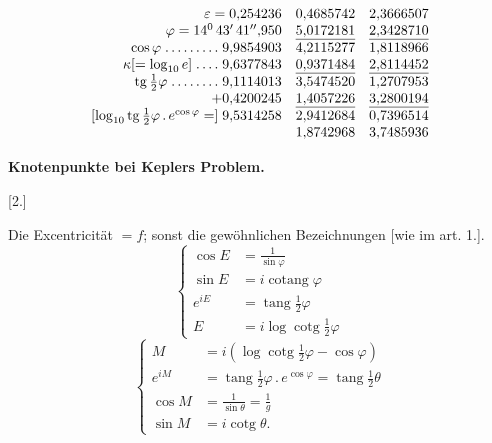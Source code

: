 \[\begin{array}{lrr}
\hfill\varepsilon=0{,}254236&0{,}4685742&2{,}3666507\\
\hfill\varphi=14^0\,43'\,41''{,}950&\underline{5{,}0172181}&\underline{2{,}3428710}\\
\hfill\cos\varphi\;{.}\,{.}\,{.}\,{.}\,{.}\,{.}\,{.}\,{.}\,{.}\;9{,}9854903&4{,}2115277&1{,}8118966\\
\hfill\kappa[=\log_{10}e]\;{.}\,{.}\,{.}\,{.}\;9{,}6377843&\underline{0{,}9371484}&\underline{2{,}8114452}\\
\hfill\operatorname{tg}\tfrac12\varphi\;{.}\,{.}\,{.}\,{.}\,{.}\,{.}\,{.}\,{.}\;9{,}1114013&3{,}5474520&1{,}2707953\\
\hfill+0{,}4200245&\underline{1{,}4057226}&\underline{3{,}2800194}\\
\raisebox{-.7\baselineskip}{\([\log_{10}\operatorname{tg}\tfrac12\varphi\,{.}\,e^{\cos\varphi}=]\;9{,}5314258\)}&2{,}9412684&0{,}7396514\\
&1{,}8742968&3{,}7485936
\end{array}\]\endgroup
\bigskip{}\par
\begin{center}\bfseries Knotenpunkte bei Keplers Problem.\end{center}
\begin{center}[2.]\end{center}
\noindent\hspace*{\parindent}Die Excentricität \(=f\); sonst die gewöhnlichen Bezeichnungen [wie im art. 1.].
\clearpage{}
\begin{equation}\left\{\begin{aligned}
\cos E&=\frac1{\sin\varphi}\\
\sin E&=i\operatorname{cotang}\varphi\\
e^{iE}&=\operatorname{tang}\tfrac12\varphi\\
E&=i\log\operatorname{cotg}\tfrac12\varphi
\end{aligned}\right.\tag*{[11]}\end{equation}
\begin{equation}\left\{\begin{aligned}
M&=i(\log\operatorname{cotg}\tfrac12\varphi-\cos\varphi)\\
e^{iM}&=\operatorname{tang}\tfrac12\varphi\,{.}\,e^{\cos\varphi}=\operatorname{tang}\tfrac12\theta\\
\cos M&=\frac1{\sin\theta}=\frac1g\\
\sin M&=i\operatorname{cotg}\theta.
\end{aligned}\right.\tag*{[12]}\end{equation}
